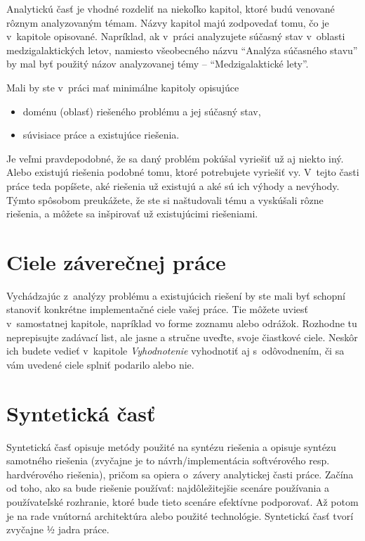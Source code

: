 Analytickú časť je vhodné rozdeliť na niekoľko kapitol, ktoré budú venované rôznym analyzovaným témam. Názvy kapitol majú zodpovedať tomu, čo je v~kapitole opisované. Napríklad, ak v~práci analyzujete súčasný stav v~oblasti medzigalaktických letov, namiesto všeobecného názvu \enquote{Analýza súčasného stavu} by mal byť použitý názov analyzovanej témy -- \enquote{Medzigalaktické lety}.

Mali by ste v~práci mať minimálne kapitoly opisujúce
\begin{itemize}
  \item doménu (oblasť) riešeného problému a jej súčasný stav,
  \item súvisiace práce a existujúce riešenia.
\end{itemize}

Je veľmi pravdepodobné, že sa daný problém pokúšal vyriešiť už aj niekto iný. Alebo existujú riešenia podobné tomu, ktoré potrebujete vyriešiť vy. V~tejto časti práce teda popíšete, aké riešenia už existujú a aké sú ich výhody a nevýhody. Týmto spôsobom preukážete, že ste si naštudovali tému a vyskúšali rôzne riešenia, a môžete sa inšpirovať už existujúcimi riešeniami.


\section*{Ciele záverečnej práce}

Vychádzajúc z~analýzy problému a existujúcich riešení by ste mali byť schopní stanoviť konkrétne implementačné ciele vašej práce. Tie môžete uviesť v~samostatnej kapitole, napríklad vo forme zoznamu alebo odrážok. Rozhodne tu neprepisujte zadávací list, ale jasne a stručne uveďte, svoje čiastkové ciele. Neskôr ich budete vedieť v~kapitole \emph{Vyhodnotenie} vyhodnotiť aj s~odôvodnením, či sa vám uvedené ciele splniť podarilo alebo nie.


\section*{Syntetická časť}

Syntetická časť opisuje metódy použité na syntézu riešenia a opisuje syntézu samotného riešenia (zvyčajne je to návrh/implementácia softvérového resp. hardvérového riešenia), pričom sa opiera o~závery analytickej časti práce. Začína od toho, ako sa bude riešenie používať: najdôležitejšie scenáre používania a používateľské rozhranie, ktoré bude tieto scenáre efektívne podporovať. Až potom je na rade vnútorná architektúra alebo použité technológie. Syntetická časť tvorí zvyčajne ½ jadra práce.

